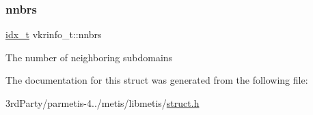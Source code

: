 \subsubsection{\texorpdfstring{nnbrs}{nnbrs}}
{\footnotesize\ttfamily \hyperlink{3rd_party_2parmetis-4_80_83_2metis_2include_2metis_8h_aaa5262be3e700770163401acb0150f52}{idx\+\_\+t} vkrinfo\+\_\+t\+::nnbrs}

The number of neighboring subdomains 

The documentation for this struct was generated from the following file\+:\begin{DoxyCompactItemize}
\item 
3rd\+Party/parmetis-\/4../metis/libmetis/\hyperlink{metis_2libmetis_2struct_8h}{struct.\+h}\end{DoxyCompactItemize}
